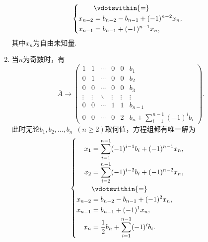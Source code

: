 \begin{exercise}
\begin{exgroup}
\begin{answer}
\begin{enumerate}
\[\begin{cases}
\begin{aligned}
                                          & \vdotswithin{ = }                                      \\
                                  x_{n-2} & =b_{n-2}-b_{n-1}+(-1)^{n-2}x_n,                        \\
                                  x_{n-1} & =b_{n-1}+(-1)^{n-1}x_n,                                \\
                              \end{aligned} \end{cases}\]
                      其中$x_n$为自由未知量.

                \item 当$n$为奇数时，有
                      \[ \bar{A}\rightarrow\begin{pmatrix}
                              1      & 1      & \cdots & 0      & 0      & b_1                                        \\
                              0      & 1      & \cdots & 0      & 0      & b_2                                        \\
                              0      & 0      & \cdots & 0      & 0      & b_3                                        \\
                              \vdots & \vdots & \ddots & \vdots & \vdots & \vdots                                     \\
                              0      & 0      & \cdots & 1      & 1      & b_{n-1}                                    \\
                              0      & 0      & \cdots & 0      & 2      & b_n+\displaystyle\sum_{i=1}^{n-1}(-1)^ib_i
                          \end{pmatrix}. \]
                      此时无论$b_1,b_2,\ldots,b_n\enspace(n\geqslant 2)$取何值，方程组都有唯一解为
                      \[\begin{cases} \begin{aligned}
                                  x_1     & =\displaystyle\sum_{i=1}^{n-1}(-1)^{i-1}b_i+(-1)^{n-1}x_n, \\
                                  x_2     & =\displaystyle\sum_{i=2}^{n-1}(-1)^{i-2}b_i+(-1)^{n-2}x_n, \\
                                          & \vdotswithin{ = }                                          \\
                                  x_{n-2} & =b_{n-2}-b_{n-1}+(-1)^2x_n,                                \\
                                  x_{n-1} & =b_{n-1}+(-1)^1x_n,                                        \\
                                  x_n     & =\frac 12b_n+\displaystyle\sum_{i=1}^{n-1}(-1)^ib_i.
                              \end{aligned} \end{cases}\]
            \end{enumerate}
        \end{answer}


\end{exgroup}
\end{exercise}

